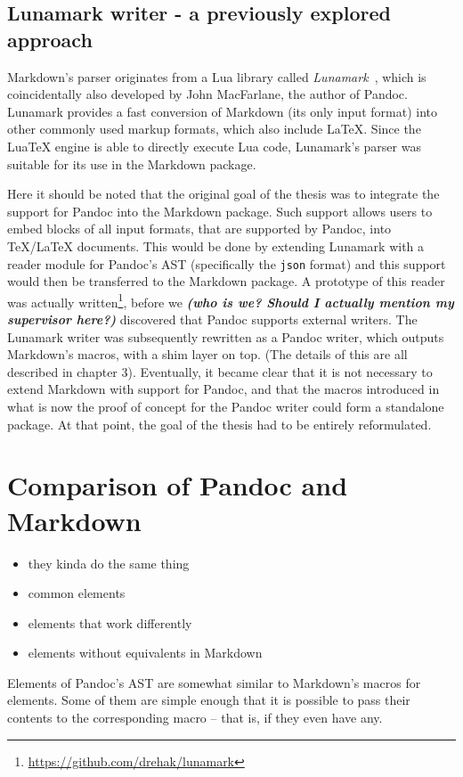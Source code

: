 \documentclass[
  digital,     %
  oneside,     %
  nosansbold,  %
  nocolorbold, %
  lof,         %
  lot,         %
]{fithesis4}
\begin{document}
\subsection{Lunamark writer - a previously explored approach}
Markdown's parser originates from a Lua library called \emph{Lunamark}~\cite{lunamark}, which is coincidentally also developed by John MacFarlane, the author of Pandoc. Lunamark provides a fast conversion of Markdown (its only input format) into other commonly used markup formats, which also include \LaTeX{}. Since the Lua\TeX{} engine is able to directly execute Lua code, Lunamark's parser was suitable for its use in the Markdown package.

Here it should be noted that the original goal of the thesis was to integrate the support for Pandoc into the Markdown package. Such support allows users to embed blocks of all input formats, that are supported by Pandoc, into \TeX{}/\LaTeX{} documents. This would be done by extending Lunamark with a reader module for Pandoc's AST (specifically the \texttt{json} format) and this support would then be transferred to the Markdown package. A prototype of this reader was actually written\footnote{\url{https://github.com/drehak/lunamark}}, before we \textbf{\textit{(who is we? Should I actually mention my supervisor here?)}} discovered that Pandoc supports external writers. The Lunamark writer was subsequently rewritten as a Pandoc writer, which outputs Markdown's macros, with a shim layer on top. (The details of this are all described in chapter 3). Eventually, it became clear that it is not necessary to extend Markdown with support for Pandoc, and that the macros introduced in what is now the proof of concept for the Pandoc writer could form a standalone package. At that point, the goal of the thesis had to be entirely reformulated.

\section{Comparison of Pandoc and Markdown}

\begin{itemize}
\item they kinda do the same thing
\item common elements
\item elements that work differently
\item elements without equivalents in Markdown
\end{itemize}

Elements of Pandoc's AST are somewhat similar to Markdown's macros for elements. Some of them are simple enough that it is possible to pass their contents to the corresponding macro -- that is, if they even have any.
\end{document}
